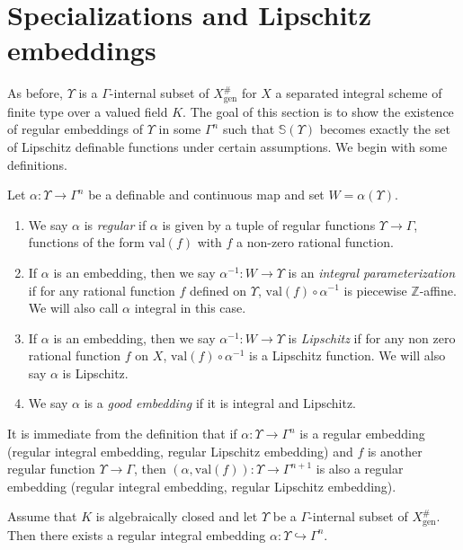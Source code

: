 \documentclass[JEP,XML,SOM,Unicode,ThmDefs,NoEqCountersInSection,published]{cedram}
\newcommand{\val}{\mathrm{val}}
\newcommand{\Z}{\mathbb Z}
\renewcommand{\SS}{\mathbb S}
\theoremstyle{plain}
\theoremstyle{definition}
\begin{document}
\section{Specializations and Lipschitz embeddings}\label{section5}
As before, $\Upsilon$ is a $\Gamma$-internal subset of $X^{\#}_{\mathrm{gen}}$ for $X$ a separated integral scheme of finite type over a valued field $K$. The goal of this section is to show the existence of regular embeddings of $\Upsilon$ in some $\Gamma^n$ such that $\SS(\Upsilon)$ becomes exactly the set of Lipschitz definable functions under certain assumptions. We begin with some definitions.
\begin{defi}\label{def:embed}
Let $\alpha:\Upsilon\to \Gamma^n$ be a definable and continuous map and set $W=\alpha(\Upsilon)$.
\begin{enumerate}
\item We say $\alpha$ is \emph{regular} if $\alpha$ is given by a tuple of regular functions $\Upsilon \to \Gamma$, \ie functions of the form $\val (f)$ with $f$ a non-zero
rational function.
\item If $\alpha$ is an embedding, then we say $\alpha^{-1}:W\to \Upsilon$ is an \emph{integral parameterization} if for any rational function $f$ defined on $\Upsilon$, $\val(f)\circ \alpha^{-1}$ is piecewise $\Z$-affine.
We will also call $\alpha$ integral in this case.
\item If $\alpha$ is an embedding, then we say $\alpha^{-1}:W\to \Upsilon$ is \emph{Lipschitz} if for any non zero rational function $f$ on $X$, $\val (f)\circ \alpha^{-1}$ is a Lipschitz function. We will also say $\alpha$ is Lipschitz.
\item We say $\alpha$ is a \emph{good embedding} if it is integral and Lipschitz.
\end{enumerate}
\end{defi}
It is immediate from the definition that if $\alpha: \Upsilon\to \Gamma^n$ is a regular embedding
(\resp regular integral embedding, \resp regular Lipschitz embedding)
and $f$ is another regular function $\Upsilon \to \Gamma$, then $(\alpha, \val (f))\colon\Upsilon\to\Gamma^{n+1}$ is also a regular embedding
(\resp regular integral embedding, \resp regular Lipschitz embedding).

\begin{lemm}\label{lemm-tfinite}
Assume that $K$ is algebraically closed
and let $\Upsilon$ be a $\Gamma$-internal subset of $X^{\#}_{\mathrm{gen}}$.
Then there exists a
regular integral embedding
$\alpha\colon \Upsilon\hookrightarrow \Gamma^n$.
\end{lemm}
\end{document}
